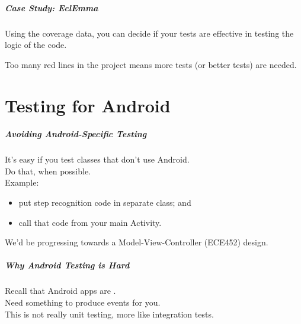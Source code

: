 \begin{frame}
\frametitle{Case Study: EclEmma}
\begin{changemargin}{1cm}
Using the coverage data, you can decide if your tests are effective in testing the logic of the code. 

Too many red lines in the project means more tests (or better tests) are needed.


\end{changemargin}
\end{frame}


\part{Testing for Android}
\frame{\partpage}

\begin{frame}
\frametitle{Avoiding Android-Specific Testing}

\begin{changemargin}{1cm}
It's easy if you test classes that don't use Android.\\[1em]

Do that, when possible.\\[1em]

Example:
\begin{itemize}
\item put step recognition code in separate class; and
\item call that code from your main Activity.
\end{itemize}
We'd be progressing towards a Model-View-Controller (ECE452) design.

\end{changemargin}
\end{frame}

\begin{frame}
\frametitle{Why Android Testing is Hard}

\begin{changemargin}{1cm}
Recall that Android apps are .\\[1em]

Need something to produce events for you.\\[1em]

This is not really unit testing, more like integration tests.
\end{changemargin}
\end{frame}


